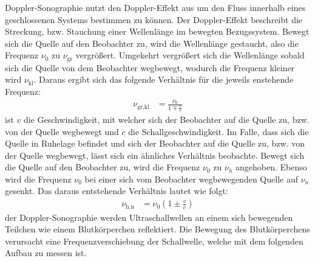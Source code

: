     \justifying Doppler-Sonographie nutzt den Doppler-Effekt aus um den Fluss innerhalb eines geschlossenen Systems bestimmen zu können. Der Doppler-Effekt 
    beschreibt die Streckung, bzw. Stauchung einer Wellenlänge im bewegten Bezugssystem. Bewegt sich die Quelle auf den Beobachter zu, wird die Wellenlänge gestaucht, also die
    Frequenz $\nu_0$ zu $\nu_{\text{gr}}$ vergrößert. Umgekehrt vergrößert sich die Wellenlänge sobald sich die Quelle von dem Beobachter wegbewegt, wodurch die Frequenz kleiner wird 
    $\nu_{\text{kl}}$. Daraus ergibt sich das folgende Verhältnis für die jeweils enstehende Frequenz: \cite{V903}
    \begin{align}
        \nu_{\text{gr,kl}} &= \frac{\nu_0}{1\mp \frac{v}{c}} \label{eq:1}
    \end{align}
    \justifying ist $v$ die Geschwindigkeit, mit welcher sich der Beobachter auf die Quelle zu, bzw. von der Quelle wegbewegt und $c$ die Schallgeschwindigkeit.
    Im Falle, dass sich die Quelle in Ruhelage befindet und sich der Beobachter auf die Quelle zu, bzw. von der Quelle wegbewegt, lässt sich ein ähnliches 
    Verhältnis beobachte. Bewegt sich die Quelle auf den Beobachter zu, wird die Frequenz $\nu_0$ zu $\nu_h$ angehoben. Ebenso wird die Frequenz $\nu_0$ bei einer sich vom Beobachter 
    wegbewegenden Quelle auf $\nu_n$ gesenkt. Das daraus entstehende Verhältnis lautet wie folgt: \cite{V903}
    \begin{align}
        \nu_{\text{h,n}} &= \nu_0 \left( 1\pm \frac{v}{c} \right) \label{eq:2}
    \end{align}
    \justifying der Doppler-Sonographie werden Ultraschallwellen an einem sich bewegenden Teilchen wie einem Blutkörperchen reflektiert. Die Bewegung des Blutkörperchens
    verursacht eine Frequenzverschiebung der Schallwelle, welche mit dem folgenden Aufbau zu messen ist.

